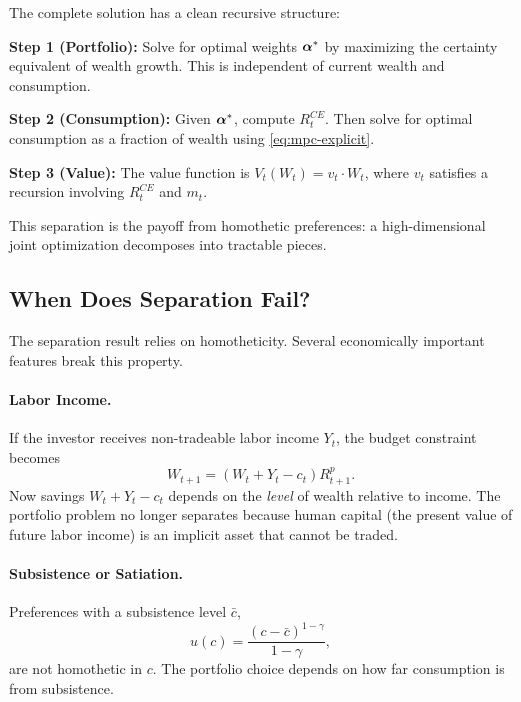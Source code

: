 \begin{calloutimportant}
The complete solution has a clean recursive structure:

\textbf{Step 1 (Portfolio):} Solve for optimal weights $\boldsymbol{\alpha}^{*}$ by maximizing the certainty equivalent of wealth growth. This is independent of current wealth and consumption.

\textbf{Step 2 (Consumption):} Given $\boldsymbol{\alpha}^{*}$, compute $R_t^{CE}$. Then solve for optimal consumption as a fraction of wealth using \eqref{eq:mpc-explicit}.

\textbf{Step 3 (Value):} The value function is $V_t(W_t) = v_t \cdot W_t$, where $v_t$ satisfies a recursion involving $R_t^{CE}$ and $m_t$.

This separation is the payoff from homothetic preferences: a high-dimensional joint optimization decomposes into tractable pieces.
\end{calloutimportant}

\subsection{When Does Separation Fail?}
\label{subsec:separation-failure}

The separation result relies on homotheticity. Several economically important features break this property.

\paragraph{Labor Income.}

If the investor receives non-tradeable labor income $Y_t$, the budget constraint becomes
\begin{equation}
W_{t+1} = (W_t + Y_t - c_t) R_{t+1}^p.
\label{eq:wealth-with-labor}
\end{equation}
Now savings $W_t + Y_t - c_t$ depends on the \emph{level} of wealth relative to income. The portfolio problem no longer separates because human capital (the present value of future labor income) is an implicit asset that cannot be traded.

\paragraph{Subsistence or Satiation.}

Preferences with a subsistence level $\bar{c}$,
\begin{equation}
u(c) = \frac{(c - \bar{c})^{1-\gamma}}{1-\gamma},
\label{eq:stone-geary}
\end{equation}
are not homothetic in $c$. The portfolio choice depends on how far consumption is from subsistence.

